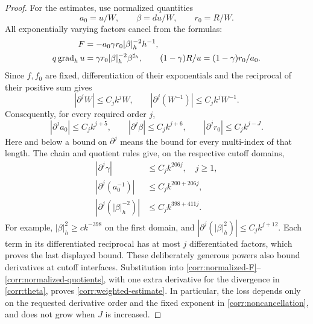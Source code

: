 \begin{proof}
For the estimates, use normalized quantities
\[
 a_0=u/W,\qquad \beta=du/W,\qquad r_0=R/W.
\]
All exponentially varying factors cancel from the formulas:
\begin{align}
 F&=-a_0\gamma r_0|\beta|_h^{-2}h^{-1},\label{corr:normalized-F}\\
 q\operatorname{grad}_hu&=\gamma r_0|\beta|_h^{-2}\beta^{\sharp_h},
 \qquad (1-\gamma)R/u=(1-\gamma)r_0/a_0.
 \label{corr:normalized-quotients}
\end{align}
Since \(f,f_0\) are fixed, differentiation of their exponentials and
the reciprocal of their positive sum gives
\[
 |\partial^jW|\le C_j k^jW,
 \qquad |\partial^j(W^{-1})|\le C_j k^jW^{-1}.
\]
Consequently, for every required order \(j\),
\begin{equation}\label{corr:normalized-bounds}
 |\partial^j a_0|\le C_jk^{j+5},\qquad
 |\partial^j\beta|\le C_jk^{j+6},\qquad
 |\partial^j r_0|\le C_jk^{j-J}.
\end{equation}
Here and below a bound on \(\partial^j\) means the bound for every
multi-index of that length.  The chain and quotient rules give, on the
respective cutoff domains,
\begin{align*}
 |\partial^j\gamma|&\le C_jk^{206j},\quad j\ge1,\\
 |\partial^j(a_0^{-1})|&\le C_jk^{200+206j},\\
 |\partial^j(|\beta|_h^{-2})|&\le C_jk^{398+411j}.
\end{align*}
For example, \(|\beta|_h^2\ge c k^{-398}\) on the first domain,
and \(|\partial^j(|\beta|_h^2)|\le C_jk^{j+12}\).
Each term in its differentiated reciprocal has at most \(j\)
differentiated factors, which proves the last displayed bound.
These deliberately generous powers also bound derivatives at cutoff
interfaces.  Substitution into
\eqref{corr:normalized-F}--\eqref{corr:normalized-quotients}, with one
extra derivative for the divergence in \eqref{corr:theta}, proves
\eqref{corr:weighted-estimate}.  In particular, the loss depends only
on the requested derivative order and the fixed exponent in
\eqref{corr:noncancellation}, and does not grow when \(J\) is increased.
\end{proof}

